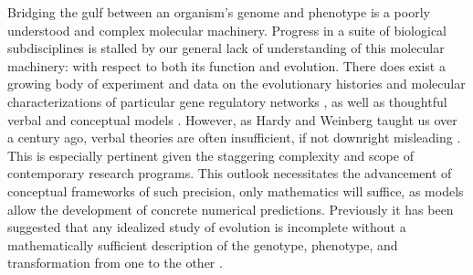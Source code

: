 \documentclass[9 pt]{article}
\newcommand{\1}{\mathbbm{1}}
\begin{document}
Bridging the gulf between an organism's genome and phenotype is a poorly understood and complex molecular machinery. Progress in a suite of biological subdisciplines is stalled by our general lack of understanding of this molecular machinery: with respect to both its function and evolution. There does exist a growing body of experiment and data on the evolutionary histories and molecular characterizations of particular gene regulatory networks \citep{jaeger2011gap, davidson2006gene, israel2016comparative}, as well as thoughtful verbal and conceptual models \citep{true2001developmental, gwagner1, weiss2000phenogenetic, edelman2001degeneracy}. However, as Hardy and Weinberg taught us over a century ago, verbal theories are often insufficient, if not downright misleading \citep{hardy1908mendelian, weinberg1908vererbungsgesetze, servedio2014not}. This is especially pertinent given the staggering complexity and scope of contemporary research programs. This outlook necessitates the advancement of conceptual frameworks of such precision, only mathematics will suffice, as models allow the development of concrete numerical predictions. Previously it has been suggested that any idealized study of evolution is incomplete without a mathematically sufficient description of the genotype, phenotype, and transformation from one to the other \citep{Lewontin1974genetic}.%



\end{document}
